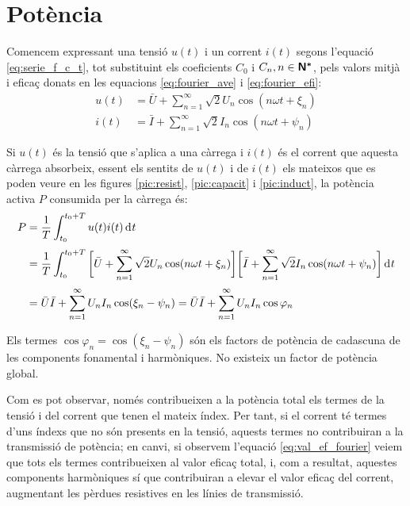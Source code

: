 \section{Potència}

Comencem expressant una tensió $u(t)$ i un corrent $i(t)$
 segons l'equació \eqref{eq:serie_f_c_t}, tot substituint els
 coeficients $C_0$ i $C_n, n \in {\ensuremath{\boldsymbol{\mathsf{N^*}}}}$, pels valors mitjà i eficaç
 donats en les equacions \eqref{eq:fourier_ave} i \eqref{eq:fourier_efi}:
 \begin{align}
    u(t)  &= \bar{U} + \sum_{n=1}^\infty \sqrt{2} U_n \cos (n \omega t +
    \xi_n)\\[0.5ex]
    i(t)  &= \bar{I} + \sum_{n=1}^\infty \sqrt{2} I_n \cos (n \omega t + \psi_n)
 \end{align}

Si  $u(t)$ és la tensió que s'aplica a una càrrega i $i(t)$ és el
corrent que aquesta càrrega absorbeix, essent els sentits de $u(t)$
i de $i(t)$ els mateixos que es poden veure en les figures
\ref{pic:resist}, \ref{pic:capacit} i \ref{pic:induct}, la potència
activa $P$ consumida per la càrrega és:
\begin{equation}\begin{split}
    P &= \frac{1}{T} \int_{t_0}^{t_0+T} u(t) i(t) \diff t 
    \\[0.5ex]
     &= \frac{1}{T} \int_{t_0}^{t_0+T} \bigg[\bar{U} + \sum_{n=1}^\infty
    \sqrt{2} U_n \cos (n \omega t + \xi_n) \bigg]
    \bigg[\bar{I} + \sum_{n=1}^\infty \sqrt{2} I_n
    \cos (n \omega t + \psi_n)\bigg] \diff t\\[0.5ex]
    &=\bar{U} \bar{I} + \sum_{n=1}^\infty U_n I_n
    \cos(\xi_n-\psi_n) = \bar{U} \bar{I} + \sum_{n=1}^\infty U_n I_n
    \cos \varphi_n \label{eq:pot_fu}
\end{split}\end{equation}

Els termes $\cos \varphi_n=\cos (\xi_n-\psi_n)$ són els factors de
potència de cadascuna de les components fonamental i harmòniques. No
existeix un factor de potència global.

 Com es pot observar, només contribueixen a la potència
total els termes de la tensió i del corrent que tenen el mateix
índex. Per tant, si el corrent té termes d'uns índexs que no són
presents en la tensió, aquests termes no contribuiran a la
transmissió de  potència; en canvi, si observem l'equació
\eqref{eq:val_ef_fourier} veiem que tots els termes contribueixen al
valor eficaç total, i, com a resultat, aquestes components harmòniques sí que
contribuiran a elevar el valor eficaç del corrent, augmentant
 les pèrdues resistives en les línies de transmissió.


